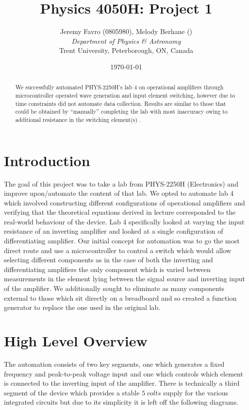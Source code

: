 \documentclass[10pt, twocolumn]{article}
\title{Physics 4050H: Project 1}
\author{Jeremy Favro (0805980), Melody Berhane () \\\emph{Department of Physics \& Astronomy}\\ Trent University, Peterborough, ON, Canada}
\date{\today}
\theoremstyle{definition}
\begin{document}
\maketitle
\listoftodos

\begin{abstract}
  We successfully automated PHYS-2250H's lab 4 on operational amplifiers through microcontroller operated
  wave generation and input element switching, however due to time constraints did not automate data collection. Results are similar to those that could be obtained
  by ``manually'' completing the lab with most inaccuracy owing to additional resistance in the switching element(s) .
\end{abstract}
\section{Introduction}
The goal of this project was to take a lab from PHYS-2250H (Electronics) and improve upon/automate the content of that lab. We opted to
automate lab 4 which involved constructing different configurations of operational amplifiers and verifying that the theoretical equations
derived in lecture corresponded to the real-world behaviour of the device. Lab 4 specifically looked at varying the input resistance of an
inverting amplifier and looked at a single configuration of differentiating amplifier. Our initial concept for automation was to go the most direct route
and use a microcontroller to control a switch which would allow selecting different components as in the case of both the inverting and differentiating amplifiers
the only component which is varied between measurements in the element lying between the signal source and inverting input of the amplifier. We additionally
sought to eliminate as many components external to those which sit directly on a breadboard and so created a function generator to replace the one used in the original lab.
\section{High Level Overview}
The automation consists of two key segments, one which generates a fixed frequency and peak-to-peak voltage input and one
which controls which element is connected to the inverting input of the amplifier. There is technically a third segment
of the device which provides a stable $\qty{5}{\unit{volts}}$ supply for the various integrated circuits but due to its simplicity
it is left off the following diagrams.
\end{document}
